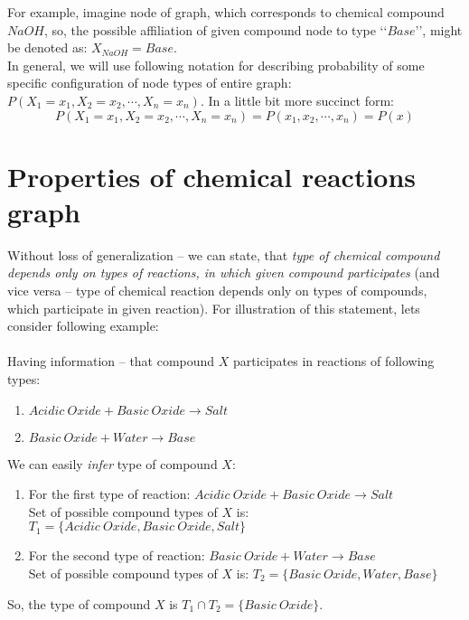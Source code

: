 \documentclass[10pt]{article}
\begin{document}
For example, imagine node of graph, which corresponds to chemical compound $NaOH$, so, the possible affiliation of given compound node to type \lq \lq $Base$\rq \rq, might be denoted as: $X_{NaOH} = Base$.
\\

In general, we will use following notation for describing probability of some specific configuration of node types of entire graph: $P(X_1 = x_1, X_2 = x_2, \cdots , X_n = x_n)$. In a little bit more succinct form: 
\begin{equation} \label{eq:probability_notation}
P(X_1 = x_1, X_2 = x_2, \cdots , X_n = x_n) = P(x_1, x_2, \cdots , x_n) = P(x)
\end{equation}

\section{Properties of chemical reactions graph}

Without loss of generalization -- we can state, that \emph{type of chemical compound depends only on types of reactions, in which given compound participates} (and vice versa -- type of chemical reaction depends only on types of compounds, which participate in given reaction). For illustration of this statement, lets consider following example: 
\\
\\
Having information -- that compound $X$ participates in reactions of following types:
\begin{enumerate}
    \item $Acidic\ Oxide + Basic\ Oxide \rightarrow Salt$
    \item $Basic\ Oxide + Water \rightarrow Base$
\end{enumerate}
We can easily \emph{infer} type of compound $X$: 
\begin{enumerate}
    \item For the first type of reaction: $Acidic\ Oxide + Basic\ Oxide \rightarrow Salt$ \\
             Set of possible compound types of $X$ is: $T_1 = \{Acidic\ Oxide, Basic\ Oxide, Salt\}$
    \item For the second type of reaction: $Basic\ Oxide + Water \rightarrow Base$ \\
             Set of possible compound types of $X$ is: $T_2 = \{Basic\ Oxide, Water, Base\}$
\end{enumerate}
So, the type of compound $X$ is $T_1 \cap T_2 = \{Basic\ Oxide\}$.
\\
\end{document}
